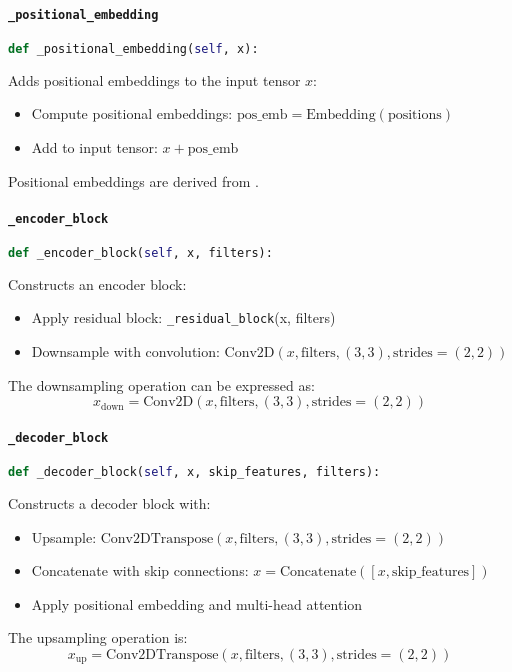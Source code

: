 \documentclass{article}
\begin{document}
\paragraph{\texttt{\_positional\_embedding}}
\begin{lstlisting}[language=Python]
def _positional_embedding(self, x):
\end{lstlisting}
Adds positional embeddings to the input tensor \(x\):
\begin{itemize}
    \item Compute positional embeddings: \(\text{pos\_emb} = \text{Embedding}(\text{positions})\)
    \item Add to input tensor: \(x + \text{pos\_emb}\)
\end{itemize}
Positional embeddings are derived from \cite{vaswani2017attention}.

\paragraph{\texttt{\_encoder\_block}}
\begin{lstlisting}[language=Python]
def _encoder_block(self, x, filters):
\end{lstlisting}
Constructs an encoder block:
\begin{itemize}
    \item Apply residual block: \texttt{\_residual\_block}(x, filters)
    \item Downsample with convolution: \( \text{Conv2D}(x, \text{filters}, (3, 3), \text{strides}=(2, 2)) \)
\end{itemize}
The downsampling operation can be expressed as:
\[
x_{\text{down}} = \text{Conv2D}(x, \text{filters}, (3, 3), \text{strides}=(2, 2))
\]

\paragraph{\texttt{\_decoder\_block}}
\begin{lstlisting}[language=Python]
def _decoder_block(self, x, skip_features, filters):
\end{lstlisting}
Constructs a decoder block with:
\begin{itemize}
    \item Upsample: \( \text{Conv2DTranspose}(x, \text{filters}, (3, 3), \text{strides}=(2, 2)) \)
    \item Concatenate with skip connections: \( x = \text{Concatenate}([x, \text{skip\_features}]) \)
    \item Apply positional embedding and multi-head attention
\end{itemize}
The upsampling operation is:
\[
x_{\text{up}} = \text{Conv2DTranspose}(x, \text{filters}, (3, 3), \text{strides}=(2, 2))
\]
\end{document}
